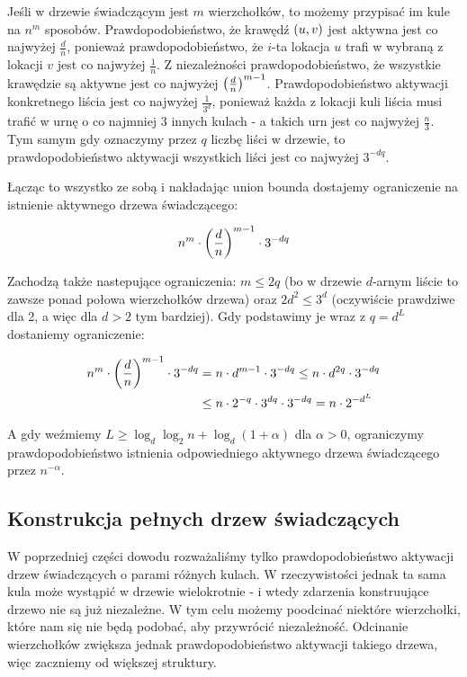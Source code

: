 Jeśli w drzewie świadczącym jest \(m\) wierzchołków, to możemy przypisać im kule na \(n^m\) sposobów.
Prawdopodobieństwo, że krawędź \(\left(u,v\right)\) jest aktywna jest co najwyżej \(\frac{d}{n}\), ponieważ prawdopodobieństwo, że \(i\)-ta lokacja \(u\) trafi w wybraną z lokacji \(v\) jest co najwyżej \(\frac{1}{n}\).
Z niezależności prawdopodobieństwo, że wszystkie krawędzie są aktywne jest co najwyżej \(\left(\frac{d}{n}\right)^{m-1}\).
Prawdopodobieństwo aktywacji konkretnego liścia jest co najwyżej \(\frac{1}{3^d}\), ponieważ każda z lokacji kuli liścia musi trafić w urnę o co najmniej \(3\) innych kulach - a takich urn jest co najwyżej \(\frac{n}{3}\).
Tym samym gdy oznaczymy przez \(q\) liczbę liści w drzewie, to prawdopodobieństwo aktywacji wszystkich liści jest co najwyżej \(3^{-dq}\).

Łącząc to wszystko ze sobą i nakładając union bounda dostajemy ograniczenie na istnienie aktywnego drzewa świadczącego:

\[
	n^m \cdot \left(\frac{d}{n}\right)^{m-1} \cdot 3^{-dq}
\]

Zachodzą także nastepujące ograniczenia: \(m \leq 2q\) (bo w drzewie \(d\)-arnym liście to zawsze ponad połowa wierzchołków drzewa) oraz \(2d^2 \leq 3^d\) (oczywiście prawdziwe dla 2, a więc dla \(d > 2\) tym bardziej). Gdy podstawimy je wraz z \(q = d^L\) dostaniemy ograniczenie:

\begin{align*}
	n^m \cdot \left(\frac{d}{n}\right)^{m-1} \cdot 3^{-dq} & = n \cdot d^{m-1} \cdot 3^{-dq} \leq n \cdot d^{2q} \cdot 3^{-dq} \\
	                                                 & \leq n \cdot 2^{-q} \cdot 3^{dq} \cdot 3^{-dq} = n \cdot 2^{-d^L}
\end{align*}

A gdy weźmiemy \(L \geq \log_d \log_2 n + \log_d(1 + \alpha)\) dla \(\alpha > 0\), ograniczymy prawdopodobieństwo istnienia odpowiedniego aktywnego drzewa świadczącego przez \(n^{-\alpha}\).

\subsection*{Konstrukcja pełnych drzew świadczących}

W poprzedniej części dowodu rozważaliśmy tylko prawdopodobieństwo aktywacji drzew świadczących o parami różnych kulach.
W rzeczywistości jednak ta sama kula może wystąpić w drzewie wielokrotnie - i wtedy zdarzenia konstruujące drzewo nie są już niezależne.
W tym celu możemy poodcinać niektóre wierzchołki, które nam się nie będą podobać, aby przywrócić niezależność.
Odcinanie wierzchołków zwiększa jednak prawdopodobieństwo aktywacji takiego drzewa, więc zaczniemy od większej struktury.

